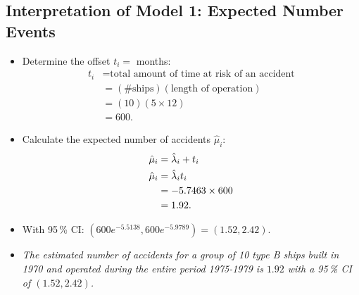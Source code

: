 \documentclass{article}\usepackage[]{graphicx}\usepackage[svgnames]{xcolor}
\makeatletter
\newcommand{\hlnum}[1]{\textcolor[rgb]{0.686,0.059,0.569}{#1}}%
\newcommand{\hlopt}[1]{\textcolor[rgb]{0,0,0}{#1}}%
\newcommand{\hlstd}[1]{\textcolor[rgb]{0.345,0.345,0.345}{#1}}%
\newcommand{\hlkwd}[1]{\textcolor[rgb]{0.737,0.353,0.396}{\textbf{#1}}}%
\newenvironment{kframe}{%
 \def\at@end@of@kframe{}%
 \ifinner\ifhmode%
  \def\at@end@of@kframe{\end{minipage}}%
  \begin{minipage}{\columnwidth}%
 \fi\fi%
 \def\FrameCommand##1{\hskip\@totalleftmargin \hskip-\fboxsep
 \colorbox{shadecolor}{##1}\hskip-\fboxsep
     \hskip-\linewidth \hskip-\@totalleftmargin \hskip\columnwidth}%
 \MakeFramed {\advance\hsize-\width
   \@totalleftmargin\z@ \linewidth\hsize
   \@setminipage}}%
 {\par\unskip\endMakeFramed%
 \at@end@of@kframe}
\newenvironment{knitrout}{}{} %
\let\exp\relax%
\let\log\relax%
\makeatother
\begin{document}
\subsection*{Interpretation of Model 1: Expected Number Events}
\begin{itemize}
      \item Determine the offset $ t_i= $ months:
            \begin{align*}
                  t_i
                   & =\text{total amount of time at risk of an accident} \\
                   & =(\text{\# ships})(\text{length of operation})      \\
                   & =(10)(5\times 12)                                   \\
                   & =600.
            \end{align*}
      \item Calculate the expected number of accidents $ \hat{\mu}_i $:
            \begin{align*}
                  \log{\hat{\mu}_i}
                              & =\log{\hat{\lambda}_i}+\log{t_i} \\
                  \hat{\mu}_i & =\hat{\lambda}_i t_i             \\
                              & =\exp{-5.7463}\times 600         \\
                              & =1.92.
            \end{align*}
      \item With 95\,\% CI: $ (600 e^{-5.5138},600 e^{-5.9789})=(1.52,2.42) $.
      \item \emph{The estimated number of accidents for a group of 10 type B ships built in 1970
                  and operated during the entire period 1975-1979 is $1.92$ with a 95\,\% CI of $(1.52,2.42)$.}
\end{itemize}
\end{document}
